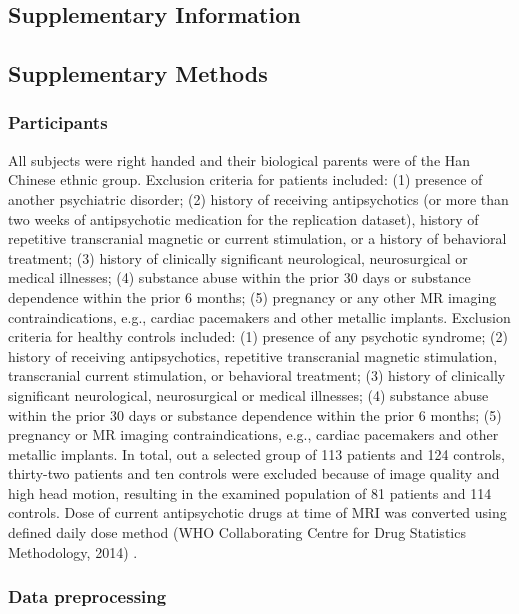 \begin{refsection}
\newpage
\section*{Supplementary Information}
\subsection*{Supplementary Methods}
\subsubsection*{Participants}
All subjects were right handed and their biological parents were of the Han Chinese ethnic group. Exclusion criteria for patients included: (1) presence of another psychiatric disorder; (2) history of receiving antipsychotics (or more than two weeks of antipsychotic medication for the replication dataset), history of repetitive transcranial magnetic or current stimulation, or a history of behavioral treatment; (3) history of clinically significant neurological, neurosurgical or medical illnesses; (4) substance abuse within the prior 30 days or substance dependence within the prior 6 months; (5) pregnancy or any other MR imaging contraindications, e.g., cardiac pacemakers and other metallic implants. Exclusion criteria for healthy controls included: (1) presence of any psychotic syndrome; (2) history of receiving antipsychotics, repetitive transcranial magnetic stimulation, transcranial current stimulation, or behavioral treatment; (3) history of clinically significant neurological, neurosurgical or medical illnesses; (4) substance abuse within the prior 30 days or substance dependence within the prior 6 months; (5) pregnancy or MR imaging contraindications, e.g., cardiac pacemakers and other metallic implants. In total, out a selected group of 113 patients and 124 controls, thirty-two patients and ten controls were excluded because of image quality and high head motion, resulting in the examined population of 81 patients and 114 controls. Dose of current antipsychotic drugs at time of MRI was converted using defined daily dose method (WHO Collaborating Centre for Drug Statistics Methodology, 2014) \citep{Leucht2016DoseEF}.

\subsubsection*{Data preprocessing}

\end{refsection}
